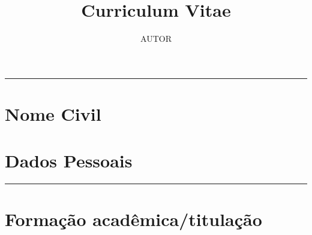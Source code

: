 \documentclass[10pt,
			   a4paper,
			   twoside,
			   extrafontsizes,
			   openright,
			   oldfontcommands]{memoir}
\title{Curriculum Vitae}
\author{AUTOR} %
\date{\monthyeardate}
\def\maketitle{%
	\null
	\thispagestyle{empty}%
	\vfill
	\begin{center}
		\vspace{46mm} %
		{\fontsize{13}{16}\selectfont \textcolor{cinza}{\textbf{\theauthor}}\par}%
		{\thetitle\par}%
		\vspace{100mm} %
		{\thedate\par}%
	\end{center}%
	\null
	\cleardoublepage
}
\DeclareRobustCommand{\linha}{
	\noindent\hfil\rule[-1mm]{\textwidth}{0.2mm}\hfil
}
\begin{document}
	\maketitle

	\mainmatter
	{\fontsize{13}{16}\selectfont \textcolor{cinza}{\textbf{\theauthor}}}\par
	\thetitle\par
	\linha
	\section*{Nome Civil}
	\section*{Dados Pessoais}
	\linha
	\section*{Formação acadêmica/titulação}
	
\end{document}
